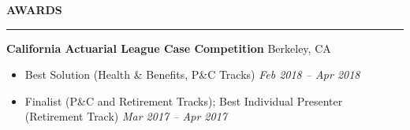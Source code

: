 \documentclass[11pt,letterpaper]{article}
\newcommand{\sectline}{\vspace{4pt}\hrule height 1.5pt\vspace{4pt}}
\newcommand{\sectspace}{\vspace{10pt}}
\newcommand{\smallspace}{\vspace{5pt}}
\begin{document}
\textbf{AWARDS} \sectline
\textbf{California Actuarial League Case Competition} \hfill Berkeley, CA \\
\begin{itemize}
\item Best Solution (Health \& Benefits, P\&C Tracks) \hfill \textit{Feb 2018 -- Apr 2018} \\
\item Finalist (P\&C and Retirement Tracks); Best Individual Presenter (Retirement Track) \hfill \textit{Mar 2017 -- Apr 2017}
\end{itemize}

\sectspace
\end{document}
